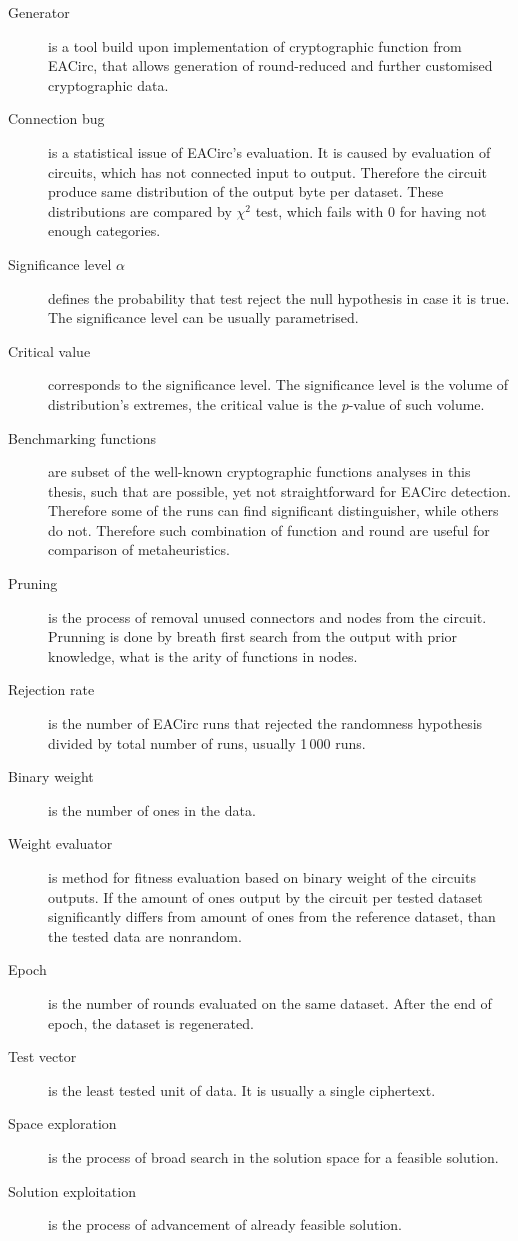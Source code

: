 \documentclass[
  print, %
  Table,   %
  nolof,     %
  nolot,     %
  11pt, %
  oneside  %
]{fithesis3}
\begin{document}
\begin{description}
    \item[Generator] is a tool build upon implementation of cryptographic function from EACirc, that allows generation of round-reduced and further customised cryptographic data.
    \item[Connection bug] is a statistical issue of EACirc's evaluation. It is caused by evaluation of circuits, which has not connected input to output. Therefore the circuit produce same distribution of the output byte per dataset. These distributions are compared by $\chi^{2}$ test, which fails with 0 for having not enough categories.
    \item[Significance level $\alpha$] defines the probability that test reject the null hypothesis in case it is true. The significance level can be usually parametrised.
    \item[Critical value] corresponds to the significance level. The significance level is the volume of distribution's extremes, the critical value is the $p$-value of such volume.
    
    \item[Benchmarking functions] are subset of the well-known cryptographic functions analyses in this thesis, such that are possible, yet not straightforward for EACirc detection. Therefore some of the runs can find significant distinguisher, while others do not. Therefore such combination of function and round are useful for comparison of metaheuristics.
    \item[Pruning] is the process of removal unused connectors and nodes from the circuit. Prunning is done by breath first search from the output with prior knowledge, what is the arity of functions in nodes.
    \item[Rejection rate] is the number of EACirc runs that rejected the randomness hypothesis divided by total number of runs, usually 1\,000 runs.
    \item[Binary weight] is the number of ones in the data.
    \item[Weight evaluator] is method for fitness evaluation based on binary weight of the circuits outputs. If the amount of ones output by the circuit per tested dataset significantly differs from amount of ones from the reference dataset, than the tested data are nonrandom.
    \item[Epoch] is the number of rounds evaluated on the same dataset. After the end of epoch, the dataset is regenerated.
    \item[Test vector] is the least tested unit of data. It is usually a single ciphertext.
    \item[Space exploration] is the process of broad search in the solution space for a feasible solution.
    \item[Solution exploitation] is the process of advancement of already feasible solution.


\end{description}
\end{document}
